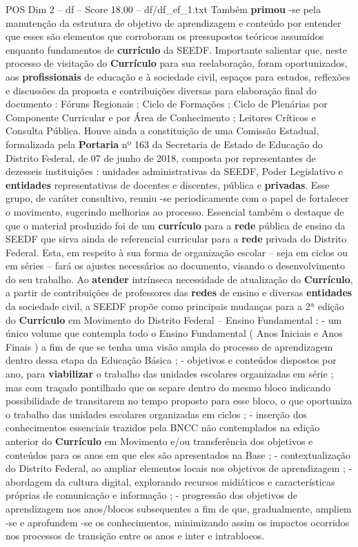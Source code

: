 \begin{textsample}{POS Dim 2 – df – Score 18.00 – df/df\_ef\_1.txt}
Também \textbf{primou} -se pela manutenção da estrutura de objetivo de aprendizagem e conteúdo por entender que esses são elementos que corroboram os pressupostos teóricos assumidos enquanto fundamentos de \textbf{currículo} da SEEDF.
Importante salientar que, neste processo de visitação do \textbf{Currículo} para sua reelaboração, foram oportunizados, aos \textbf{profissionais} de educação e à sociedade civil, espaços para estudos, reflexões e discussões da proposta e contribuições diversas para elaboração final do documento : Fóruns Regionais ; Ciclo de Formações ; Ciclo de Plenárias por Componente Curricular e por Área de Conhecimento ; Leitores Críticos e Consulta Pública.
Houve ainda a constituição de uma Comissão Estadual, formalizada pela \textbf{Portaria} nº 163 da Secretaria de Estado de Educação do Distrito Federal, de 07 de junho de 2018, composta por representantes de dezesseis instituições : unidades administrativas da SEEDF, Poder Legislativo e \textbf{entidades} representativas de docentes e discentes, pública e \textbf{privadas}.
Esse grupo, de caráter consultivo, reuniu -se periodicamente com o papel de fortalecer o movimento, sugerindo melhorias ao processo.
Essencial também o destaque de que o material produzido foi de um \textbf{currículo} para a \textbf{rede} pública de ensino da SEEDF que sirva ainda de referencial curricular para a \textbf{rede} privada do Distrito Federal.
Esta, em respeito à sua forma de organização escolar – seja em ciclos ou em séries – fará os ajustes necessários ao documento, visando o desenvolvimento do seu trabalho.
Ao \textbf{atender} intrínseca necessidade de atualização do \textbf{Currículo}, a partir de contribuições de professores das \textbf{redes} de ensino e diversas \textbf{entidades} da sociedade civil, a SEEDF propõe como principais mudanças para a 2ª edição do \textbf{Currículo} em Movimento do Distrito Federal – Ensino Fundamental : - um único volume que contempla todo o Ensino Fundamental ( Anos Iniciais e Anos Finais ) a fim de que se tenha uma visão ampla do processo de aprendizagem dentro dessa etapa da Educação Básica ; - objetivos e conteúdos dispostos por ano, para \textbf{viabilizar} o trabalho das unidades escolares organizadas em série ; mas com traçado pontilhado que os separe dentro do mesmo bloco indicando possibilidade de transitarem no tempo proposto para esse bloco, o que oportuniza o trabalho das unidades escolares organizadas em ciclos ; - inserção dos conhecimentos essenciais trazidos pela BNCC não contemplados na edição anterior do \textbf{Currículo} em Movimento e/ou transferência dos objetivos e conteúdos para os anos em que eles são apresentados na Base ; - contextualização do Distrito Federal, ao ampliar elementos locais nos objetivos de aprendizagem ; - abordagem da cultura digital, explorando recursos midiáticos e características próprias de comunicação e informação ; - progressão dos objetivos de aprendizagem nos anos/blocos subsequentes a fim de que, gradualmente, ampliem -se e aprofundem -se os conhecimentos, minimizando assim os impactos ocorridos nos processos de transição entre os anos e inter e intrablocos.

\end{textsample}
